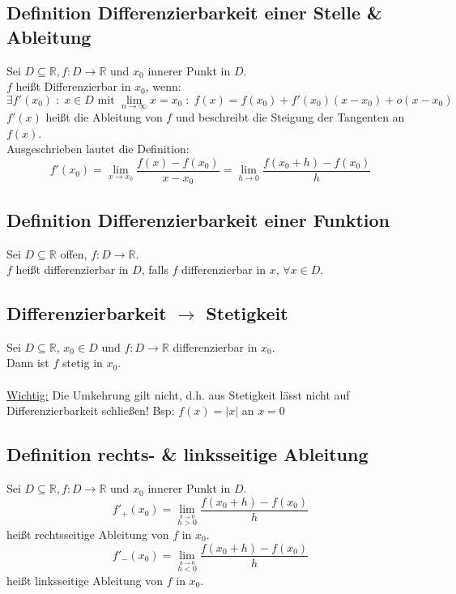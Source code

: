 \documentclass[halfparscip]{scrartcl}
\newcounter{subsection2}
\begin{document}
\subsection{Definition Differenzierbarkeit einer Stelle \& Ableitung}
Sei $D \subseteq \mathbb{R}, f: D \rightarrow \mathbb{R}$ und $x_0$ innerer Punkt in $D$.\\
$f$ heißt Differenzierbar in $x_0$, wenn:
\begin{equation*}
	\exists f'(x_0) \;:\; x \in D \text{ mit } \lim_{n \rightarrow \infty}x = x_0 \;:\; f(x) = f(x_0) + f'(x_0)(x-x_0)+o(x-x_0)
\end{equation*}
$f'(x)$ heißt die Ableitung von $f$ und beschreibt die Steigung der Tangenten an $f(x)$.\\
Ausgeschrieben lautet die Definition:
\begin{equation*}
	f'(x_0) = \lim_{x\rightarrow x_0} \frac{f(x) - f(x_0)}{x - x_0} = \lim_{h\rightarrow 0} \frac{f(x_0 + h) - f(x_0)}{h}
\end{equation*}

\subsection{Definition Differenzierbarkeit einer Funktion}
Sei $D \subseteq \mathbb{R}$ offen, $f : D \rightarrow \mathbb{R}$.\\
$f$ heißt differenzierbar in $D$, falls $f$ differenzierbar in $x$, $\forall x \in D$.

\addtocounter{subsection}{2}
\subsection{Differenzierbarkeit $\rightarrow$ Stetigkeit}
Sei $D \subseteq \mathbb{R}$, $x_0 \in D$ und $f : D \rightarrow \mathbb{R}$ differenzierbar in $x_0$.\\
Dann ist $f$ stetig in $x_0$.\\\\
\underline{Wichtig:} Die Umkehrung gilt nicht, d.h. aus Stetigkeit lässt nicht auf Differenzierbarkeit schließen! Bsp: $f(x) = \vert x\vert$ an $x = 0$

\subsection{Definition rechts- \& linksseitige Ableitung}
Sei $D \subseteq \mathbb{R}, f: D \rightarrow \mathbb{R}$ und $x_0$ innerer Punkt in $D$.\\
\begin{equation*}
	f'_+(x_0) = \lim_{\stackrel{h\rightarrow 0}{h > 0}}\frac{f(x_0 + h) - f(x_0)}{h}
\end{equation*}
heißt rechtsseitige Ableitung von $f$ in $x_0$.
\begin{equation*}
f'_-(x_0) = \lim_{\stackrel{h\rightarrow 0}{h < 0}}\frac{f(x_0 + h) - f(x_0)}{h}
\end{equation*}
heißt linksseitige Ableitung von $f$ in $x_0$.
\end{document}
